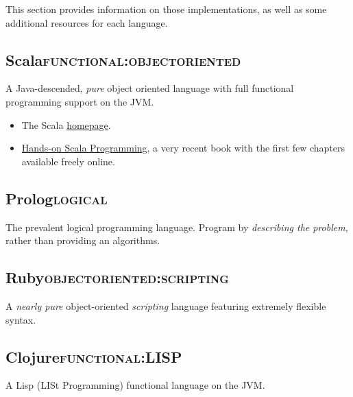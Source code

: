 \documentclass[11pt]{article}
\begin{document}
This section provides information on those implementations,
as well as some additional resources for each language.

\subsection{Scala\hfill{}\textsc{functional:objectoriented}}
\label{sec:org55e8091}
A Java-descended, \emph{pure} object oriented language
with full functional programming support on the JVM.

\begin{itemize}
\item The Scala \href{https://scala-lang.org/}{homepage}.
\item \href{https://www.handsonscala.com/index.html}{Hands-on Scala Programming},
a very recent book with the first few chapters available freely online.
\end{itemize}

\subsection{Prolog\hfill{}\textsc{logical}}
\label{sec:org2eca1cd}
The prevalent logical programming language.
Program by \emph{describing the problem}, rather than providing an algorithms. 

\subsection{Ruby\hfill{}\textsc{objectoriented:scripting}}
\label{sec:org4ed60e7}
A \emph{nearly pure} object-oriented \emph{scripting} language
featuring extremely flexible syntax.

\subsection{Clojure\hfill{}\textsc{functional:LISP}}
\label{sec:org19f113a}
A Lisp (LISt Programming) functional language on the JVM.
\end{document}
